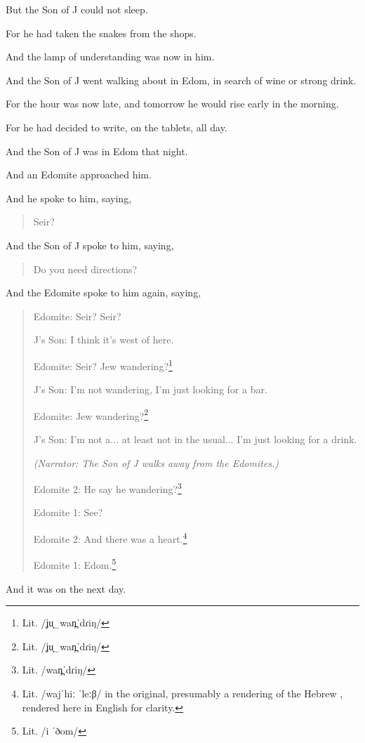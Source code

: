 
\Sentence
{ \hX{} }
{ \eX{} }
{ But the Son of J could not sleep.

  For he had taken the snakes from the shops.

  And the lamp of understanding was now in him. }

\Sentence
{ \hX{} }
{ \eX{} }
{ And the Son of J went walking about in Edom, in search of wine or strong drink.

  For the hour was now late, and tomorrow he would rise early in the morning.

  For he had decided to write, on the tablets, all day. }

\Sentence
{ \hX{} }
{ \eX{} }
{ And the Son of J was in Edom that night.

  And an Edomite approached him.

  And he spoke to him, saying,
  \begin{quote}Seir?\end{quote}
  And the Son of J spoke to him, saying,
  \begin{quote}Do you need directions?\end{quote} }

\Sentence
{ \hX{} }
{ \eX{} }
{ And the Edomite spoke to him again, saying,
  \begin{quote}
    Edomite: Seir? Seir?

    J's Son: I think it's west of here.

    Edomite: Seir? Jew wandering?\footnote{Lit. /ʝu̞‿wan̪ˈdɾiŋ/}

    J's Son: I'm not wandering, I'm just looking for a bar.

    Edomite: Jew wandering?\footnote{Lit. /ʝu̞‿wan̪ˈdɾiŋ/}

    J's Son: I'm not a... at least not in the usual...  I'm just looking for a drink.

    \textsl{(Narrator: The Son of J walks away from the Edomites.)}

    Edomite 2: He say he wandering?\footnote{Lit. /wan̪ˈdɾiŋ/}

    Edomite 1: See?

    Edomite 2: And there was a heart.\footnote{Lit. /wajˈhiː ˈleːβ/ in the original, presumably a rendering of the Hebrew , rendered here in English for clarity.}

    Edomite 1: Edom.\footnote{Lit. /i ˈðom/}
  \end{quote} }

\Sentence
{ \hX{} }
{ \eX{} }
{ And it was on the next day. }

